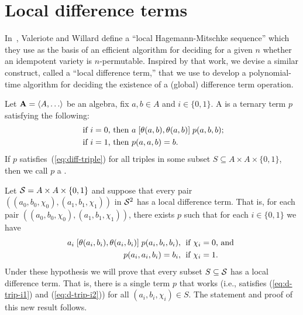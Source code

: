 \section{Local difference terms}
\label{sec:local-diff-terms}
In~\cite{MR3239624},
Valeriote and Willard define %
a ``local Hagemann-Mitschke sequence'' which they use as the basis of
an efficient algorithm for deciding for a given $n$ whether an idempotent
variety is $n$-permutable. 
Inspired by that work, we devise a similar construct, called
a ``local difference term,'' that we use to develop a polynomial-time
algorithm for deciding the existence of a (global) difference term operation.



Let $\bA=\< A, \dots\>$ be an algebra, fix $a, b \in A$ and
$i \in \{0,1\}$.
A  is a ternary term $p$ satisfying the following:
\begin{align}
\text{ if $i=0$, then } & a \comm{\Cg(a,b)}{\Cg(a,b)} p(a,b,b); \label{eq:diff-triple}\\
\text{ if $i=1$, then } &p(a,a,b) = b. \nonumber
\end{align}
If $p$ satisfies~(\ref{eq:diff-triple}) for all triples
in some subset $S\subseteq A \times A \times \{0,1\}$, then we call $p$
a .

Let 
$\mathcal{S} = A \times A \times \{0,1\}$ and
suppose that every pair
$((a_0, b_0, \chi_0), (a_1, b_1, \chi_1))$
in $\mathcal{S}^2$ has a local difference term.
That is, for each pair $((a_0, b_0, \chi_0), (a_1, b_1, \chi_1))$, there exists
$p$ such that for each $i \in \{0,1\}$ we have
\begin{align}
  a_i \comm{\Cg(a_i,b_i)}{\Cg(a_i,b_i)} p(a_i,b_i,b_i), & \;
  \text{ if $\chi_i=0$, and }  \label{eq:d-trip-i1}\\
  p(a_i,a_i,b_i) =b_i, & \;
  \text{ if $\chi_i=1$.}\label{eq:d-trip-i2} %
\end{align}
Under these hypothesis we will prove that every subset $S\subseteq \mathcal{S}$
has a local difference term.
That is, there is a single term $p$ that works (i.e., satisfies
(\ref{eq:d-trip-i1}) and (\ref{eq:d-trip-i2})) for all $(a_i, b_i, \chi_i) \in S$.
The statement and proof of this new result follows.

